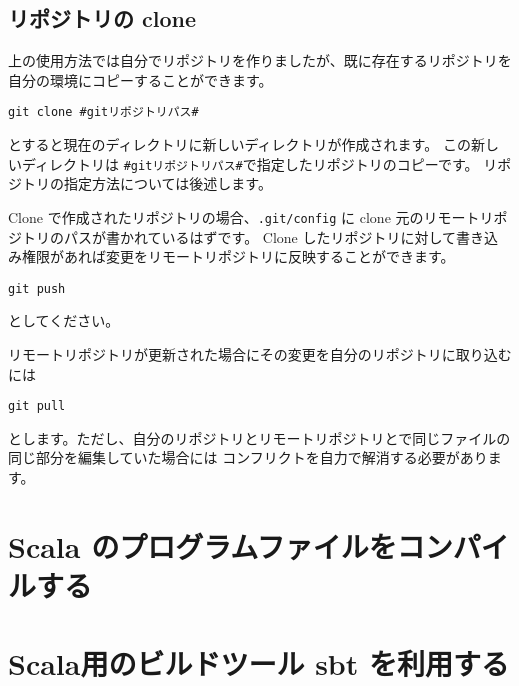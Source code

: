 \documentclass[a4paper]{article}
\begin{document}
\subsection{リポジトリの clone}
上の使用方法では自分でリポジトリを作りましたが、既に存在するリポジトリを自分の環境にコピーすることができます。
\begin{verbatim}
git clone #gitリポジトリパス#
\end{verbatim}
とすると現在のディレクトリに新しいディレクトリが作成されます。
この新しいディレクトリは \texttt{\#gitリポジトリパス\#}で指定したリポジトリのコピーです。
リポジトリの指定方法については後述します。

Clone で作成されたリポジトリの場合、\texttt{.git/config} に clone 元のリモートリポジトリのパスが書かれているはずです。
Clone したリポジトリに対して書き込み権限があれば変更をリモートリポジトリに反映することができます。
\begin{verbatim}
git push
\end{verbatim}
としてください。

リモートリポジトリが更新された場合にその変更を自分のリポジトリに取り込むには
\begin{verbatim}
git pull
\end{verbatim}
とします。ただし、自分のリポジトリとリモートリポジトリとで同じファイルの同じ部分を編集していた場合には
コンフリクトを自力で解消する必要があります。


\section{Scala のプログラムファイルをコンパイルする}

\section{Scala用のビルドツール sbt を利用する}
\fi
\end{document}
